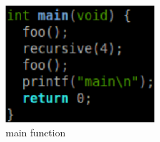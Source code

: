 \documentclass[11pt,letterpaper,oneside]{article}
\begin{document}
\begin{figure}
\begin{center}
\includegraphics[width=0.5\textwidth]{fig7.eps}
\caption{main function}
\label{fig:main}
\end{center}
\end{figure}
\end{document}

